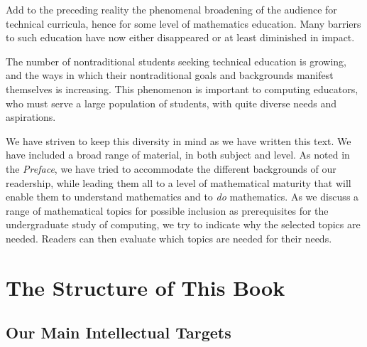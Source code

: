\medskip

Add to the preceding reality the phenomenal broadening of the audience
for technical curricula, hence for some level of mathematics
education.  Many barriers to such education have now either
disappeared or at least diminished in impact.

\medskip

The number of nontraditional students seeking technical education is
growing, and the ways in which their nontraditional goals and
backgrounds manifest themselves is increasing.  This phenomenon is
important to computing educators, who must serve a large population of
students, with quite diverse needs and aspirations.

We have striven to keep this diversity in mind as we have written this
text.  We have included a broad range of material, in both subject and
level.  As noted in the {\it Preface}, we have tried to accommodate
the different backgrounds of our readership, while leading them all to
a level of mathematical maturity that will enable them to understand
mathematics and to {\em do} mathematics.  As we
discuss a range of mathematical topics for possible inclusion as
prerequisites for the undergraduate study of computing, we try to
indicate why the selected topics are needed.  Readers can then
evaluate which topics are needed for their needs.

\section{The Structure of This Book}
\label{sec:thisbook}

\subsection{Our Main Intellectual Targets}
\label{sec:book-overwiew}

